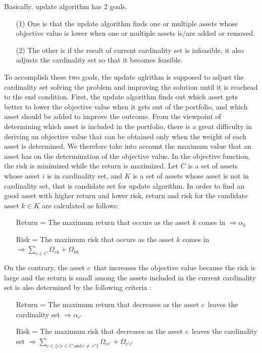 \documentclass[11pt]{article}
\begin{document}
\begin{itemize}
	
	 Basically, update algorithm has 2 goals. 
	\begin{itemize}
		\item[(1)] One is that the update algorithm finds one or multiple assets whose objective value is lower when one or multiple assets is/are added or removed. 
		\item[(2)] The other is if the result of current cardinality set is infeasible, it also adjusts the cardinality set so that it becomes feasible.
	\end{itemize}
	To accomplish these two goals, the update aglrithm is supposed to adjust the cardinality set solving the problem and improving the solution until it is reachead to the end condition. First, the update algorithm finds out which asset gets better to lower the objective value when it gets out of the portfolio, and which asset should be added to improve the outcome. From the viewpoint of determining which asset is included in the portfolio, there is a great difficulty in deriving an objective value that can be obtained only when the weight of each asset is determined. We therefore take into account the maximum value that an asset has on the determination of the objective value. In the objective function, the risk is minimized while the return is maximized. Let $C$ is a set of assets whose asset $i$ is in cardinality set, and $K$ is a set of assets whose asset is not in cardinality set, that is candidate set for update algorithm. In order to find an good asset with higher return and lower risk, return and risk for the candidate asset $k \in K$ are calculated as follows:
	\begin{itemize}
		\item[\textbullet] Return = The maximum return that occurs as the asset $k$ comes in $\Rightarrow \alpha_k$
		\item[\textbullet] Risk = The maximum risk that occurs as the asset $k$ comes in $\Rightarrow \sum_{c \in C}\Omega_{ck} + \Omega_{kk}$
	\end{itemize}
	On the contrary, the asset $c$\textasciiacute$\,$ that increases the objective value because the risk is large and the return is small among the assets included in the current cardinality set is also determined by the following criteria : 
	\begin{itemize}
	\item[\textbullet] Return = The maximum return that decreases as the asset $c$\textasciiacute$\,$ leaves the cardinality set $\Rightarrow \alpha_{{c}'}$
	\item[\textbullet] Risk =  The maximum risk that decreases as the asset $c$\textasciiacute$\,$ leaves the cardinality set $\Rightarrow \sum_{c \in \{c | c \in C \, \text{and} \, c \neq \ {c}' \}}\Omega_{c {c}'} + \Omega_{{c}' {c}'}$

\end{itemize}
\end{itemize}
\end{document}
